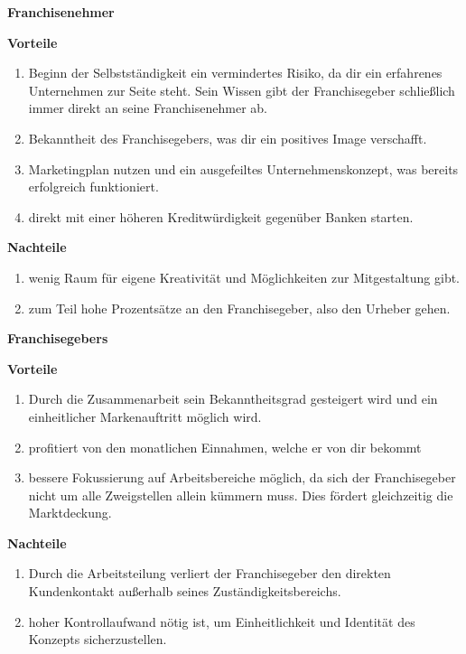 \textbf{Franchisenehmer}

\textbf{Vorteile}

\begin{enumerate}
\item
  Beginn der Selbstständigkeit ein vermindertes Risiko, da dir ein
  erfahrenes Unternehmen zur Seite steht. Sein Wissen gibt der
  Franchisegeber schließlich immer direkt an seine Franchisenehmer ab.
\item
  Bekanntheit des Franchisegebers, was dir ein positives Image
  verschafft.
\item
  Marketingplan nutzen und ein ausgefeiltes Unternehmenskonzept, was
  bereits erfolgreich funktioniert.
\item
  direkt mit einer höheren Kreditwürdigkeit gegenüber Banken starten.
\end{enumerate}

\textbf{Nachteile}

\begin{enumerate}
\item
  wenig Raum für eigene Kreativität und Möglichkeiten zur Mitgestaltung
  gibt.
\item
  zum Teil hohe Prozentsätze an den Franchisegeber, also den Urheber
  gehen.
\end{enumerate}

\textbf{Franchisegebers}

\textbf{Vorteile}

\begin{enumerate}
\item
  Durch die Zusammenarbeit sein Bekanntheitsgrad gesteigert wird und ein
  einheitlicher Markenauftritt möglich wird.
\item
  profitiert von den monatlichen Einnahmen, welche er von dir bekommt
\item
  bessere Fokussierung auf Arbeitsbereiche möglich, da sich der
  Franchisegeber nicht um alle Zweigstellen allein kümmern muss. Dies
  fördert gleichzeitig die Marktdeckung.
\end{enumerate}

\textbf{Nachteile}

\begin{enumerate}
\item
  Durch die Arbeitsteilung verliert der Franchisegeber den direkten
  Kundenkontakt außerhalb seines Zuständigkeitsbereichs.
\item
  hoher Kontrollaufwand nötig ist, um Einheitlichkeit und Identität des
  Konzepts sicherzustellen.
\end{enumerate}

